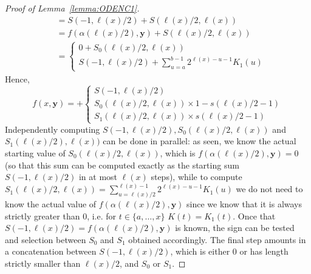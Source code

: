 \documentclass[11pt, oneside]{article}
\newcommand{\tu}[1]{\mathbf{#1}}
\theoremstyle{definition}
\begin{document}
\begin{toappendix}
\begin{proof}[Proof of Lemma~\ref{lemma:ODENC1}]
\begin{align*}
        &= S(-1, \ell(x)/2) + S(\ell(x)/2, \ell(x)) \\
        &= f(\alpha(\ell(x)/2), \tu y) + S(\ell(x)/2, \ell(x)) \\
        &= \begin{cases}
            0 + S_0(\ell(x)/2, \ell(x)) \\
            S(-1, \ell(x)/2) + \sum^{b-1}_{u=a} 2^{\ell(x)-u-1} K_1(u)
        \end{cases}
    \end{align*}
    Hence,
    $$
     f(x, \tu y) = + \begin{cases}
        S(-1, \ell(x)/2) \\
        S_0(\ell(x)/2, \ell(x)) \times 1 - s(\ell(x)/2-1) \\
        S_1(\ell(x)/2, \ell(x)) \times s(\ell(x)/2-1)
    \end{cases}
    $$
    Independently computing $S(-1, \ell(x)/2), S_0(\ell(x)/2, \ell(x))$ and $S_1(\ell(x)/2), \ell(x))$ can be done in parallel: as seen, we know the actual starting value of $S_0(\ell(x)/2, \ell(x))$, which is $f(\alpha(\ell(x)/2), \tu y)=0$ (so that this sum can be computed exactly as the starting sum $S(-1, \ell(x)/2)$ in at most $\ell(x)$ steps), while to compute $S_1(\ell(x)/2, \ell(x))=\sum^{\ell(x)-1}_{u=\ell(x)/2} 2^{\ell(x)-u-1}K_1(u)$ we do not need to know the actual value of $f(\alpha(\ell(x)/2), \tu y)$ since we know that it is always strictly greater than 0, i.e. for $t\in \{a, \dots, x\}$ $K(t)=K_1(t)$.
    Once that $S(-1, \ell(x)/2)=f(\alpha(\ell(x)/2), \tu y)$ is known, the sign can be tested and selection between $S_0$ and $S_1$ obtained accordingly.
    The final step amounts in a concatenation between $S(-1, \ell(x)/2)$, which is either 0 or has length strictly smaller than $\ell(x)/2$, and $S_0$ or $S_1$.
\end{proof}









\end{toappendix}
\end{document}
